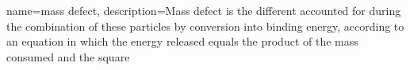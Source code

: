 {
    name=mass defect,
    description={Mass defect is the different accounted for during the combination of these particles by conversion into binding energy, according to an equation in which the energy released equals the product of the mass consumed and the square}
}
